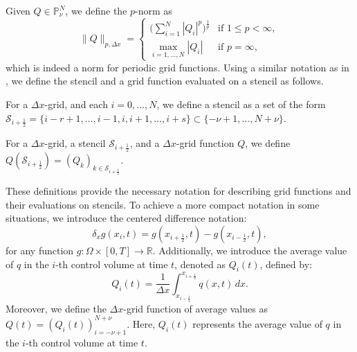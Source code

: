 Given $Q \in \mathbb{P}^{N}_{\nu}$, we define the $p$-norm as
\begin{equation}
	\label{chp-adv1d-sec-not1}
	\|Q\|_{p,\Delta x}=
	\begin{cases}
		\bigg( \sum_{i=1}^{N} |Q_i|^p \bigg)^{\frac{1}{p}} & \text{if } 1\leq p < \infty,\\
		\max_{i=1, \ldots, N}{|Q_i|} & \text{if } p=\infty,
	\end{cases}
\end{equation}
which is indeed a norm for periodic grid functions.
Using a similar notation as in \citet{engwirda:2016}, we define the stencil and a grid function evaluated on a stencil as follows.
\begin{definition}[Stencil]
	For a $\Delta x$-grid, and each $i = 0, \ldots, N$, we define a stencil as a set of the form
	$\mathcal{S}_{i+\frac{1}{2}} = \{i-r+1, \ldots, i-1, i, i+1, \ldots, i+s\} \subset\{-\nu+1, \ldots, N+\nu\}$.
\end{definition}
\begin{definition}
	For a $\Delta x$-grid, a stencil $\mathcal{S}_{i+\frac{1}{2}}$,
	 and a $\Delta x$-grid function $Q$, we define $Q(\mathcal{S}_{i+\frac{1}{2}}) = (Q_k)_{k \in \mathcal{S}_{i+\frac{1}{2}}}$.
\end{definition}
These definitions provide the necessary notation for describing grid functions and their evaluations on stencils.
To achieve a more compact notation in some situations, we introduce the centered difference notation:
\begin{equation}
    \label{chp-adv1d-sec-adv-eq5}
	\delta_x {g}(x_i,t) = 
	{g}(x_{i+\frac{1}{2}},t) - 
	{g}(x_{i-\frac{1}{2}},t),
\end{equation}
for any function $g: \Omega \times [0,T] \to \mathbb{R}$.
Additionally, we introduce the average value of $q$ in the $i$-th control volume at time $t$, denoted as ${Q}_i(t)$, defined by:
\begin{equation}
	\label{chp-adv1d-sec1-not2}
	{Q}_i(t) = \frac{1}{\Delta x} \int_{x_{i-\frac{1}{2}}}^{x_{i+\frac{1}{2}}} {q}(x,t) \,dx.
\end{equation}
Moreover, we define the $\Delta x$-grid function of average values as $Q(t) = (Q_i(t))_{i=-\nu+1}^{N+\nu}$.
Here, $Q_i(t)$ represents the average value of $q$ in the $i$-th control volume at time $t$.

